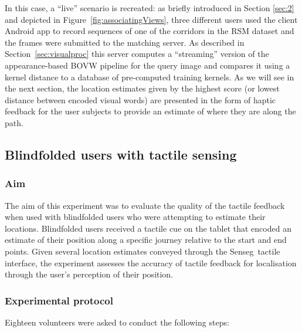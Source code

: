 In this case, a ``live'' scenario is recreated: as briefly introduced in Section \ref{sec:2} and depicted in Figure~\ref{fig:associatingViews}, three different users used the client Android app to record sequences of one of the corridors in the RSM dataset and the frames were submitted to the matching server. As described in Section~\ref{sec:visualproc} this server computes a ``streaming'' version of the appearance-based BOVW pipeline for the query image and compares it using a kernel distance to a database of pre-computed training kernels. As we will see in the next section, the location estimates given by the highest score (or lowest distance between encoded visual words) are presented in the form of haptic feedback for the user subjects to provide an estimate of where they are along the path.


\subsection{Blindfolded users with tactile sensing}
\label{subsec:tactile_feedback}
\subsubsection{Aim}
The aim of this experiment was to evaluate the quality of the tactile feedback when used with blindfolded users who were attempting to estimate their locations. Blindfolded users received a tactile cue on the tablet that encoded an estimate of their position along a specific journey relative to the start and end points. Given several location estimates conveyed through the Senseg\texttrademark\ tactile interface, the experiment assesses the accuracy of tactile feedback for localisation through the user's perception of their position.

\subsubsection{Experimental protocol}
Eighteen volunteers were asked to conduct the following steps:

